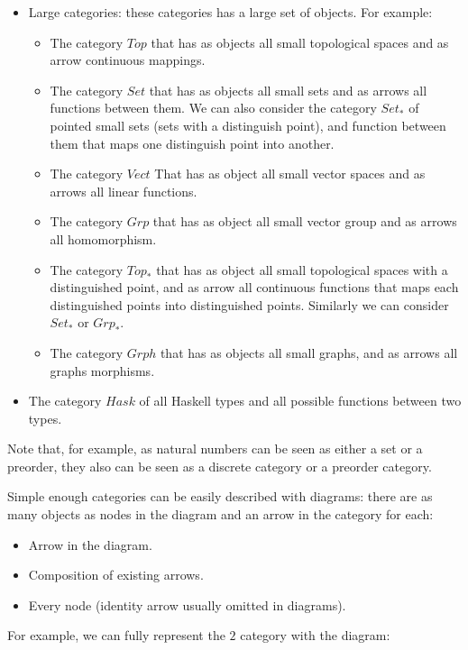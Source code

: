 \begin{example}
\begin{itemize}
\item Large categories: these categories has a large set of objects. For example:
  \begin{itemize}
  \item The category $Top$ that has as objects all small topological spaces and as arrow continuous mappings.
\item The category $Set$ that has as objects all small sets and as arrows all functions between them. We can also consider the category $Set_*$ of pointed small sets (sets with a distinguish point), and function between them that maps one distinguish point into another.  
\item The category $Vect$ That has as object all small vector spaces and as arrows all linear functions.
\item The category $Grp$ that has as object all small vector group and as arrows all homomorphism.
\item The category $Top_*$ that has as object all small topological spaces with a distinguished point, and as arrow all continuous functions that maps each distinguished points into distinguished points. Similarly we can consider $Set_*$ or $Grp_*$.
\item The category $Grph$ that has as objects all small graphs, and as arrows all graphs morphisms.
\end{itemize}

\item The category $Hask$ of all Haskell types and all possible functions between two types.\\
  
\end{itemize}
Note that, for example, as natural numbers can be seen as either a set or a preorder, they also can be seen as a discrete category or a preorder category.
\end{example}


Simple enough categories can be easily described with diagrams: there are as many objects as nodes in the diagram and an arrow in the category for each:
\begin{itemize}
\item Arrow in the diagram. 
\item Composition of existing arrows.
\item Every node (identity arrow usually omitted in diagrams).
\end{itemize}

For example, we can fully represent the $2$ category with the diagram:

